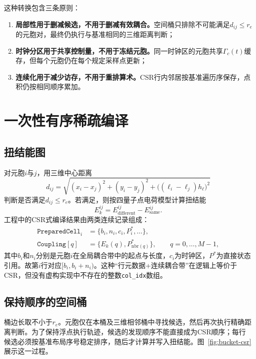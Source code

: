 \documentclass[UTF8,a4paper,11pt]{ctexart}
\newcommand{\csr}{\textsc{CSR}}
\begin{document}
这种转换包含三条原则：
\begin{enumerate}
  \item \textbf{局部性用于删减候选，不用于删减有效耦合。}空间桶只排除不可能满足$d_{ij}\le r_e$的元胞对，最终仍执行与基准相同的三维距离判断；
  \item \textbf{时钟分区用于共享控制量，不用于冻结元胞。}同一时钟区的元胞共享$\Gamma_c(t)$缓存，但每个元胞仍在每个规定采样点更新；
  \item \textbf{连续化用于减少访存，不用于重排算术。}\csr{}行内邻居按基准遍历序保存，点积仍按相同顺序累加。
\end{enumerate}

\section{一次性有序稀疏编译}

\subsection{扭结能图}

对元胞$i$与$j$，用三维中心距离
\begin{equation}
 d_{ij}=\sqrt{(x_i-x_j)^2+(y_i-y_j)^2+
 \bigl((\ell_i-\ell_j)h_\ell\bigr)^2}
\end{equation}
判断是否满足$d_{ij}\le r_e$。若满足，则按四量子点电荷模型计算扭结能
\begin{equation}
 E_k^{ij}=E_{\mathrm{different}}^{ij}-E_{\mathrm{same}}^{ij}.
\end{equation}
工程中的\csr{}式编译结果由两类连续记录组成：
\begin{align}
 \texttt{PreparedCell}_i&=\{b_i,n_i,c_i,P_i^\ast,\ldots\},\\
 \texttt{Coupling}[q]&=\{E_k(q),P_{\mathrm{nbr}(q)}^\ast\},
 \qquad q=0,\ldots,M-1,
\end{align}
其中$b_i$和$n_i$分别是元胞$i$在全局耦合带中的起点与长度，$c_i$为时钟区，$P^\ast$为直接状态引用。故第$i$行对应$[b_i,b_i+n_i)$。这种“行元数据+连续耦合带”在逻辑上等价于\csr{}，但没有虚构实现中不存在的整数\texttt{col\_idx}数组。

\subsection{保持顺序的空间桶}

桶边长取不小于$r_e$。元胞仅在本桶及三维相邻桶中寻找候选，然后再次执行精确距离判断。为了保持浮点执行轨迹，候选的发现顺序不能直接成为\csr{}顺序；每行候选必须按基准布局序号稳定排序，随后才计算并写入扭结能。图~\ref{fig:bucket-csr}展示这一过程。
\end{document}
